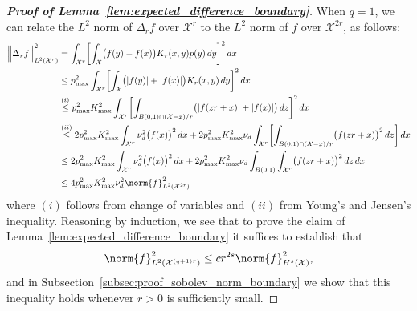 \documentclass{article}
\newcommand{\abs}[1]{\left \lvert #1 \right \rvert}
\newcommand{\1}{\mathbf{1}}
\newcommand{\Xset}{\mathcal{X}}
\newcommand{\Leb}{L}
\theoremstyle{alden}
\theoremstyle{aldenthm}
\theoremstyle{definition}
\theoremstyle{remark}
\begin{document}
\begin{proof}[\textbf{Proof of Lemma~\ref{lem:expected_difference_boundary}}]
	When $q = 1$, we can relate the $\Leb^2$ norm of $\Delta_rf$ over $\Xset^r$ to the $\Leb^2$ norm of $f$ over $\Xset^{2r}$, as follows:
	\begin{align*}
	\Bigl\|\Delta_rf\Bigr\|_{\Leb^2(\Xset^r)}^2 & = \int_{\Xset^r} \biggl[\int_{\Xset} \bigl(f(y) - f(x)\bigr)K_r(x,y) p(y) \,dy \biggr]^2 \,dx \\
	& \leq p_{\max}^2 \int_{\Xset^r} \biggl[\int_{\Xset} \bigl(\abs{f(y)} +  \abs{f(x)}\bigr)K_r(x,y) \,dy \biggr]^2 \,dx \\
	& \overset{(i)}{\leq}  p_{\max}^2 K_{\max}^2 \int_{\Xset^r} \biggl[\int_{B(0,1) \cap (\Xset - x)/r} \bigl(\abs{f(zr + x)} +  \abs{f(x)}\bigr)\,dz \biggr]^2 \,dx \\
	& \overset{(ii)}{\leq} 2 p_{\max}^2 K_{\max}^2 \int_{\Xset^r} \nu_d^2 \bigl(f(x)\bigr)^2 \,dx + 2 p_{\max}^2 K_{\max}^2 \nu_d \int_{\Xset^r}\biggl[\int_{B(0,1) \cap (\Xset - x)/r} \bigl(f(zr + x)\bigr)^2\,dz\biggr] \,dx \\
	& \leq 2 p_{\max}^2 K_{\max}^2 \int_{\Xset^r} \nu_d^2 \bigl(f(x)\bigr)^2 \,dx + 2 p_{\max}^2 K_{\max}^2 \nu_d \int_{B(0,1)} \int_{\Xset^r} \bigl(f(zr + x)\bigr)^2\,dz \,dx \\
	& \leq 4 p_{\max}^2 K_{\max}^2 \nu_d^2 \norm{f}_{\Leb^2(\Xset^{2r})}^2
	\end{align*}
	where $(i)$ follows from change of variables and $(ii)$ from Young's and Jensen's inequality. Reasoning by induction, we see that to prove the claim of Lemma~\ref{lem:expected_difference_boundary} it suffices to establish that
	\begin{equation}
	\label{pf:expected_difference_boundary}
	\norm{f}_{\Leb^2(\Xset^{(q + 1)r})}^2 \leq c r^{2s} \norm{f}_{H^s(\Xset)}^2,
	\end{equation}
	and in Subsection~\ref{subsec:proof_sobolev_norm_boundary} we show that this inequality holds whenever $r > 0$ is sufficiently small.
\end{proof}
\end{document}
